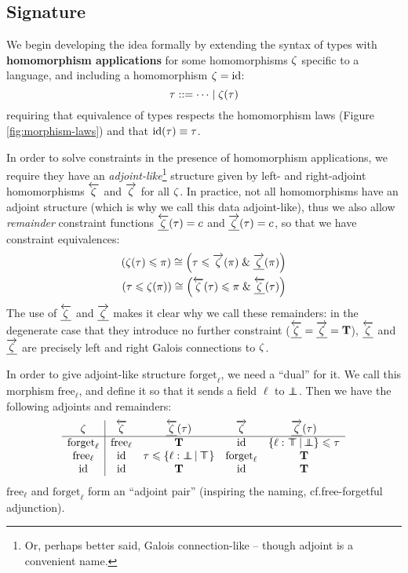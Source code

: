 \subsection{Signature}
\label{subsec:signature-morphisms}

We begin developing the idea formally by extending the syntax of types with \textbf{homomorphism applications} for some homomorphisms $\zeta$ specific to a language, and including a homomorphism $\zeta = \mathrm{id}$:
$$ \tau ::= \cdots \mid \zeta(\tau) $$
requiring that equivalence of types respects the homomorphism laws (Figure \ref{fig:morphism-laws}) and that $\mathrm{id}(\tau) \equiv \tau$. 

In order to solve constraints in the presence of homomorphism applications, we require they have an \emph{adjoint-like}\footnote{Or, perhaps better said, Galois connection-like -- though adjoint is a convenient name.} structure given by left- and right-adjoint homomorphisms $\overleftarrow{\zeta}$ and $\overrightarrow{\zeta}$ for all $\zeta$. In practice, not all homomorphisms have an adjoint structure (which is why we call this data adjoint-like), thus we also allow \emph{remainder} constraint functions $\underline{\overleftarrow{\zeta}}(\tau) = c$ and $\underline{\overrightarrow{\zeta}}(\tau) = c$, so that we have constraint equivalences:
\begin{align*}
(\morph(\tau) \sub \pi) \cstreq \left(\tau \sub \radj \morph(\pi) \und \radjrest \morph(\pi) \right) \\
(\tau \sub \morph(\pi)) \cstreq \left(\ladj \morph(\tau) \sub \pi \und \ladjrest \morph(\tau) \right)
\end{align*}
The use of $\underline{\overleftarrow{\zeta}}$ and $\underline{\overrightarrow{\zeta}}$ makes it clear why we call these remainders: in the degenerate case that they introduce no further constraint ($\underline{\overleftarrow{\zeta}} = \underline{\overrightarrow{\zeta}} = \mathbf T$), $\underline{\overleftarrow{\zeta}}$ and $\underline{\overrightarrow{\zeta}}$ are precisely left and right Galois connections to $\zeta$.

\begin{example}
    In order to give adjoint-like structure $\mathrm{forget}_\ell$, we need a \enquote{dual} for it. We call this morphism $\mathrm{free}_\ell$, and define it so that it sends a field $\ell$ to $\bot \!\!\!\! \bot$. Then we have the following adjoints and remainders:
    $$\begin{array}{c|cccc}
    \morph & \ladj \morph & \ladjrest \morph(\tau) & \radj \morph & \radjrest \morph(\tau) \\ \hline 
    \mathrm{forget}_\ell & \mathrm{free}_\ell & \tru & \mathrm{id} & \flext{\ell : \flftop}{\flfbot} \sub \tau \\
    \mathrm{free}_\ell & \mathrm{id} & \tau \sub \flext{\ell : \flfbot}{\flftop} & \mathrm{forget}_\ell & \tru \\ 
    \mathrm{id} & \mathrm{id} & \tru & \mathrm{id} & \tru 
    \end{array}$$
    $\mathrm{free}_\ell$ and $\mathrm{forget}_\ell$ form an \enquote{adjoint pair} (inspiring the naming, cf.\@ free-forgetful adjunction).
\end{example}

